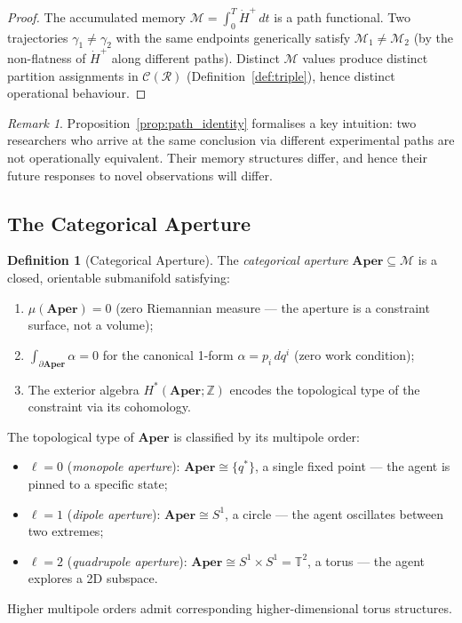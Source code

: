 \documentclass[twocolumn,11pt,a4paper]{article}
\theoremstyle{plain}
\theoremstyle{definition}
\newtheorem{definition}[theorem]{Definition}
\theoremstyle{remark}
\newtheorem{remark}[theorem]{Remark}
\newcommand{\Mspace}{\mathcal{M}}
\newcommand{\Hplus}{\dot{H}^{+}}
\newcommand{\Z}{\mathbb{Z}}
\newcommand{\Aper}{\mathbf{Aper}}
\begin{document}
\begin{proof}
The accumulated memory $\mathcal{M} = \int_0^T \Hplus\,dt$ is a path functional.  Two trajectories $\gamma_1 \ne \gamma_2$ with the same endpoints generically satisfy $\mathcal{M}_1 \ne \mathcal{M}_2$ (by the non-flatness of $\Hplus$ along different paths).  Distinct $\mathcal{M}$ values produce distinct partition assignments in $\mathcal{C}(\mathcal{R})$ (Definition~\ref{def:triple}), hence distinct operational behaviour.
\end{proof}

\begin{remark}
Proposition~\ref{prop:path_identity} formalises a key intuition: two researchers who arrive at the same conclusion via different experimental paths are not operationally equivalent.  Their memory structures differ, and hence their future responses to novel observations will differ.
\end{remark}

\subsection{The Categorical Aperture}

\begin{definition}[Categorical Aperture]
\label{def:aperture}
The \emph{categorical aperture} $\Aper \subseteq \Mspace$ is a closed, orientable submanifold satisfying:
\begin{enumerate}[label=(\roman*)]
  \item $\mu(\Aper) = 0$ (zero Riemannian measure — the aperture is a constraint surface, not a volume);
  \item $\int_{\partial\Aper} \alpha = 0$ for the canonical 1-form $\alpha = p_i\,dq^i$ (zero work condition);
  \item The exterior algebra $H^*(\Aper; \Z)$ encodes the topological type of the constraint via its cohomology.
\end{enumerate}
\end{definition}

The topological type of $\Aper$ is classified by its multipole order:
\begin{itemize}[noitemsep]
  \item $\ell = 0$ (\emph{monopole aperture}): $\Aper \cong \{q^*\}$, a single fixed point — the agent is pinned to a specific state;
  \item $\ell = 1$ (\emph{dipole aperture}): $\Aper \cong S^1$, a circle — the agent oscillates between two extremes;
  \item $\ell = 2$ (\emph{quadrupole aperture}): $\Aper \cong S^1 \times S^1 = \mathbb{T}^2$, a torus — the agent explores a 2D subspace.
\end{itemize}
Higher multipole orders admit corresponding higher-dimensional torus structures.
\end{document}
